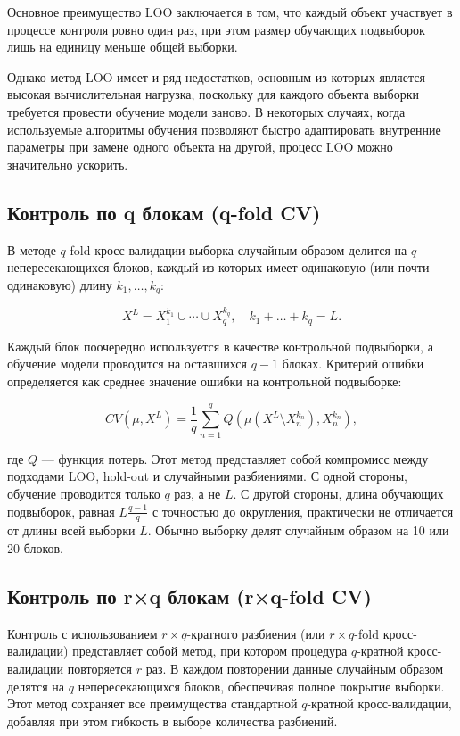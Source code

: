 Основное преимущество LOO заключается в том, что каждый объект участвует в процессе контроля ровно один раз, при этом размер обучающих подвыборок лишь на единицу меньше общей выборки.

Однако метод LOO имеет и ряд недостатков, основным из которых является высокая вычислительная нагрузка, поскольку для каждого объекта выборки требуется провести обучение модели заново. В некоторых случаях, когда используемые алгоритмы обучения позволяют быстро адаптировать внутренние параметры при замене одного объекта на другой, процесс LOO можно значительно ускорить.

\subsection{Контроль по q блокам (q-fold CV)}

В методе \( q \)-fold кросс-валидации выборка случайным образом делится на \( q \) непересекающихся блоков, каждый из которых имеет одинаковую (или почти одинаковую) длину \( k_1, \ldots, k_q \):

\[
    X^L = X^{k_1}_1 \cup \cdots \cup X^{k_q}_q, \quad k_1 + \dots + k_q = L.
\]

Каждый блок поочередно используется в качестве контрольной подвыборки, а обучение модели проводится на оставшихся \( q-1 \) блоках. Критерий ошибки определяется как среднее значение ошибки на контрольной подвыборке:

\[
    CV(\mu, X^L) = \frac{1}{q} \sum_{n=1}^q Q \left( \mu \left( X^L \setminus X^{k_n}_n \right), X^{k_n}_n \right),
\]

где \( Q \) — функция потерь. Этот метод представляет собой компромисс между подходами LOO, hold-out и случайными разбиениями. С одной стороны, обучение проводится только \( q \) раз, а не \( L \). С другой стороны, длина обучающих подвыборок, равная \( L \frac{q-1}{q} \) с точностью до округления, практически не отличается от длины всей выборки \( L \). Обычно выборку делят случайным образом на 10 или 20 блоков.

\subsection{Контроль по r×q блокам (r×q-fold CV)}
Контроль с использованием \(r \times q\)-кратного разбиения (или \(r \times q\)-fold кросс-валидации) представляет собой метод, при котором процедура \(q\)-кратной кросс-валидации повторяется \(r\) раз. В каждом повторении данные случайным образом делятся на \(q\) непересекающихся блоков, обеспечивая полное покрытие выборки. Этот метод сохраняет все преимущества стандартной \(q\)-кратной кросс-валидации, добавляя при этом гибкость в выборе количества разбиений.

